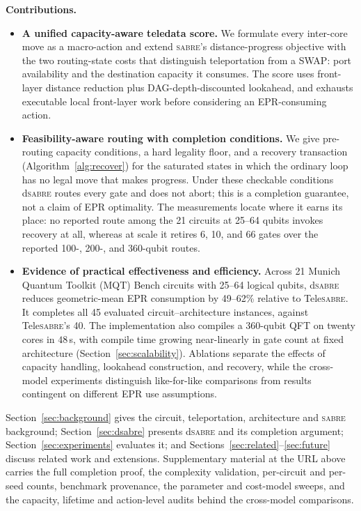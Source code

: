 \documentclass[journal]{IEEEtran}
\newcommand{\dSABRE}{d\textsc{sabre}}
\newcommand{\TeleSABRE}{Tele\textsc{sabre}}
\newcommand{\SABRE}{\textsc{sabre}}
\begin{document}
\textbf{Contributions.}
\begin{itemize}
\item \textbf{A unified capacity-aware teledata score.} We formulate every
inter-core move as a macro-action and extend \SABRE{}'s distance-progress
objective with the two routing-state costs that distinguish teleportation
from a
SWAP: port availability and the destination capacity it consumes. The score
uses front-layer distance reduction plus DAG-depth-discounted lookahead, and
exhausts executable local front-layer work before considering an
EPR-consuming action.

\item \textbf{Feasibility-aware routing with completion conditions.} We give
pre-routing capacity conditions, a hard legality floor, and a recovery
transaction (Algorithm~\ref{alg:recover}) for the saturated
states in which the ordinary loop has no legal move that makes progress.
Under these checkable conditions \dSABRE{} routes every gate and does not
abort; this is a completion guarantee, not a claim of EPR optimality.
The measurements locate where it earns its place: no reported route among
the 21 circuits at 25--64 qubits invokes recovery at all, whereas at scale it
retires 6, 10, and 66 gates over the reported 100-, 200-, and 360-qubit
routes.

\item \textbf{Evidence of practical effectiveness and efficiency.} Across 21
Munich Quantum Toolkit (MQT) Bench circuits with 25--64 logical qubits,
\dSABRE{} reduces geometric-mean EPR consumption by 49--62\% relative to
\TeleSABRE{}. It completes all 45 evaluated circuit--architecture
instances, against \TeleSABRE{}'s 40. The implementation also compiles a 360-qubit
QFT on twenty cores in $48$\,s, with compile time growing near-linearly in
gate count at fixed architecture (Section~\ref{sec:scalability}). Ablations separate the effects of capacity handling,
lookahead construction, and recovery, while the cross-model experiments
distinguish like-for-like comparisons from results contingent on different EPR
use assumptions.
\end{itemize}

Section~\ref{sec:background} gives the circuit, teleportation, architecture and
\SABRE{} background; Section~\ref{sec:dsabre} presents \dSABRE{} and its
completion argument; Section~\ref{sec:experiments} evaluates it; and
Sections~\ref{sec:related}--\ref{sec:future} discuss related work and
extensions.  Supplementary material at the URL above carries the full
completion proof, the complexity validation, per-circuit and per-seed counts,
benchmark provenance, the parameter and cost-model sweeps, and the capacity,
lifetime and action-level audits behind the cross-model comparisons.
\end{document}
